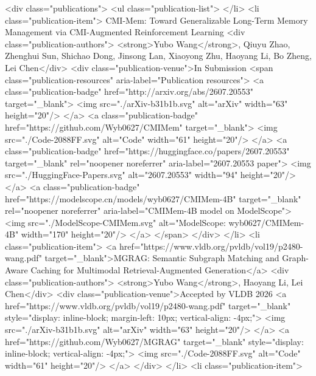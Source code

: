 <div class="publications">
    <ul class="publication-list">
        </li>
         <li class="publication-item">
            CMI-Mem: Toward Generalizable Long-Term Memory Management via CMI-Augmented Reinforcement Learning
            <div class="publication-authors"> <strong>Yubo Wang</strong>, Qiuyu Zhao, Zhenghui Sun, Shichao Dong, Jinsong Lan, Xiaoyong Zhu, Haoyang Li, Bo Zheng, Lei Chen</div>
            <div class="publication-venue">In Submission
                <span class="publication-resources" aria-label="Publication resources">
                <a class="publication-badge" href="http://arxiv.org/abs/2607.20553" target="_blank">
                    <img src="./arXiv-b31b1b.svg" alt="arXiv" width="63" height="20"/>
                </a>
                <a class="publication-badge" href="https://github.com/Wyb0627/CMIMem" target="_blank">
                    <img src="./Code-2088FF.svg" alt="Code" width="61" height="20"/>
                </a>
                <a class="publication-badge" href="https://huggingface.co/papers/2607.20553" target="_blank" rel="noopener noreferrer" aria-label="2607.20553 paper">
                    <img src="./HuggingFace-Papers.svg" alt="2607.20553" width="94" height="20"/>
                </a>
                <a class="publication-badge" href="https://modelscope.cn/models/wyb0627/CMIMem-4B" target="_blank" rel="noopener noreferrer" aria-label="CMIMem-4B model on ModelScope">
                    <img src="./ModelScope-CMIMem.svg" alt="ModelScope: wyb0627/CMIMem-4B" width="170" height="20"/>
                </a>
                </span>
           </div>
        </li>
        <li class="publication-item">
            <a href="https://www.vldb.org/pvldb/vol19/p2480-wang.pdf" target="_blank">MGRAG: Semantic Subgraph Matching and Graph-Aware Caching for Multimodal Retrieval-Augmented Generation</a>
            <div class="publication-authors"> <strong>Yubo Wang</strong>, Haoyang Li, Lei Chen</div>
            <div class="publication-venue">Accepted by VLDB 2026
                <a href="https://www.vldb.org/pvldb/vol19/p2480-wang.pdf" target="_blank" style="display: inline-block; margin-left: 10px; vertical-align: -4px;">
                    <img src="./arXiv-b31b1b.svg" alt="arXiv" width="63" height="20"/>
                </a>
                <a href="https://github.com/Wyb0627/MGRAG" target="_blank" style="display: inline-block; vertical-align: -4px;">
                    <img src="./Code-2088FF.svg" alt="Code" width="61" height="20"/>
                </a>
           </div>
        </li>
        <li class="publication-item">
